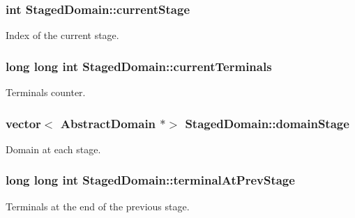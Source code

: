 \subsubsection[{\texorpdfstring{current\+Stage}{currentStage}}]{\setlength{\rightskip}{0pt plus 5cm}int Staged\+Domain\+::current\+Stage\hspace{0.3cm}{\ttfamily [private]}}\hypertarget{class_staged_domain_a0fc23a88dcfb07e4a2b5d3899811a2a6}{}\label{class_staged_domain_a0fc23a88dcfb07e4a2b5d3899811a2a6}
Index of the current stage. 
\subsubsection[{\texorpdfstring{current\+Terminals}{currentTerminals}}]{\setlength{\rightskip}{0pt plus 5cm}long long int Staged\+Domain\+::current\+Terminals\hspace{0.3cm}{\ttfamily [private]}}\hypertarget{class_staged_domain_a8383f99269b421f85b89c3aa847f91ce}{}\label{class_staged_domain_a8383f99269b421f85b89c3aa847f91ce}
Terminals counter. 
\subsubsection[{\texorpdfstring{domain\+Stage}{domainStage}}]{\setlength{\rightskip}{0pt plus 5cm}vector$<$ {\bf Abstract\+Domain} $\ast$$>$ Staged\+Domain\+::domain\+Stage\hspace{0.3cm}{\ttfamily [private]}}\hypertarget{class_staged_domain_a3372c80d0c3bff5255c0d4a7bbce3647}{}\label{class_staged_domain_a3372c80d0c3bff5255c0d4a7bbce3647}
Domain at each stage. 
\subsubsection[{\texorpdfstring{terminal\+At\+Prev\+Stage}{terminalAtPrevStage}}]{\setlength{\rightskip}{0pt plus 5cm}long long int Staged\+Domain\+::terminal\+At\+Prev\+Stage\hspace{0.3cm}{\ttfamily [private]}}\hypertarget{class_staged_domain_a94b7ffac4fc6e07fc14061cdf68475b7}{}\label{class_staged_domain_a94b7ffac4fc6e07fc14061cdf68475b7}
Terminals at the end of the previous stage. 
